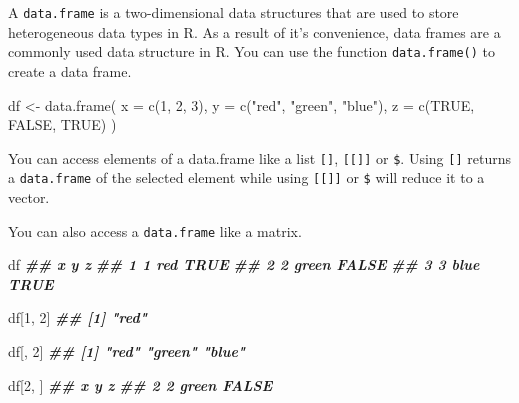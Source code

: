 \documentclass[
]{book}
\newenvironment{Shaded}{\begin{snugshade}}{\end{snugshade}}
\newcommand{\AttributeTok}[1]{\textcolor[rgb]{0.77,0.63,0.00}{#1}}
\newcommand{\ConstantTok}[1]{\textcolor[rgb]{0.00,0.00,0.00}{#1}}
\newcommand{\DecValTok}[1]{\textcolor[rgb]{0.00,0.00,0.81}{#1}}
\newcommand{\DocumentationTok}[1]{\textcolor[rgb]{0.56,0.35,0.01}{\textbf{\textit{#1}}}}
\newcommand{\FunctionTok}[1]{\textcolor[rgb]{0.00,0.00,0.00}{#1}}
\newcommand{\NormalTok}[1]{#1}
\newcommand{\OtherTok}[1]{\textcolor[rgb]{0.56,0.35,0.01}{#1}}
\newcommand{\SpecialCharTok}[1]{\textcolor[rgb]{0.00,0.00,0.00}{#1}}
\newcommand{\StringTok}[1]{\textcolor[rgb]{0.31,0.60,0.02}{#1}}
\begin{document}
A \texttt{data.frame} is a two-dimensional data structures that are used to store heterogeneous data types in R. As a result of it's convenience, data frames are a commonly used data structure in R. You can use the function \texttt{data.frame()} to create a data frame.

\begin{Shaded}
\begin{Highlighting}[]
\NormalTok{df }\OtherTok{\textless{}{-}} \FunctionTok{data.frame}\NormalTok{(}
  \AttributeTok{x =} \FunctionTok{c}\NormalTok{(}\DecValTok{1}\NormalTok{, }\DecValTok{2}\NormalTok{, }\DecValTok{3}\NormalTok{),}
  \AttributeTok{y =} \FunctionTok{c}\NormalTok{(}\StringTok{"red"}\NormalTok{, }\StringTok{"green"}\NormalTok{, }\StringTok{"blue"}\NormalTok{),}
  \AttributeTok{z =} \FunctionTok{c}\NormalTok{(}\ConstantTok{TRUE}\NormalTok{, }\ConstantTok{FALSE}\NormalTok{, }\ConstantTok{TRUE}\NormalTok{)}
\NormalTok{)}
\end{Highlighting}
\end{Shaded}

You can access elements of a data.frame like a list \texttt{{[}{]}}, \texttt{{[}{[}{]}{]}} or \texttt{\$}. Using \texttt{{[}{]}} returns a \texttt{data.frame} of the selected element while using \texttt{{[}{[}{]}{]}} or \texttt{\$} will reduce it to a vector.

\begin{Shaded}
\end{Shaded}

You can also access a \texttt{data.frame} like a matrix.

\begin{Shaded}
\begin{Highlighting}[]
\NormalTok{df}
\DocumentationTok{\#\#   x     y     z}
\DocumentationTok{\#\# 1 1   red  TRUE}
\DocumentationTok{\#\# 2 2 green FALSE}
\DocumentationTok{\#\# 3 3  blue  TRUE}

\NormalTok{df[}\DecValTok{1}\NormalTok{, }\DecValTok{2}\NormalTok{]}
\DocumentationTok{\#\# [1] "red"}

\NormalTok{df[, }\DecValTok{2}\NormalTok{]}
\DocumentationTok{\#\# [1] "red"   "green" "blue"}

\NormalTok{df[}\DecValTok{2}\NormalTok{, ]}
\DocumentationTok{\#\#   x     y     z}
\DocumentationTok{\#\# 2 2 green FALSE}
\end{Highlighting}
\end{Shaded}
\end{document}
